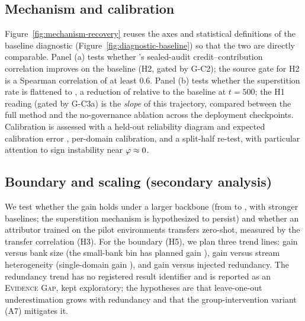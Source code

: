 \subsection{Mechanism and calibration}
Figure~\ref{fig:mechanism-recovery} reuses the axes and statistical definitions of
the baseline diagnostic (Figure~\ref{fig:diagnostic-baseline}) so that the two are
directly comparable. Panel (a) tests whether \aca{}'s sealed-audit
credit--contribution correlation  improves on the baseline
 (H2, gated by G-C2); the source gate for H2 is a
Spearman correlation of at least $0.6$. Panel (b) tests whether the superstition rate
is flattened to , a reduction of
 relative to the baseline at $t = 500$; the H1
reading (gated by G-C3a) is the \emph{slope} of this trajectory, compared between the
full method and the no-governance ablation across the deployment checkpoints. Calibration is
assessed with a held-out reliability diagram and expected calibration error
, per-domain calibration, and a split-half re-test, with
particular attention to sign instability near $\varphi \approx 0$.



\subsection{Boundary and scaling (secondary analysis)}
We test whether the gain holds under a larger backbone (from
 to , with stronger baselines; the
superstition mechanism is hypothesized to persist) and whether an attributor trained
on the pilot environments transfers zero-shot, measured by the transfer correlation
 (H3). For the boundary (H5), we plan three
trend lines: gain versus bank size (the small-bank bin has planned gain
), gain versus stream heterogeneity (single-domain
gain ), and gain versus injected redundancy. The
redundancy trend has no registered result identifier and is reported as an
\textsc{Evidence Gap}, kept exploratory; the hypotheses are that leave-one-out
underestimation grows with redundancy and that the group-intervention variant (A7)
mitigates it.

